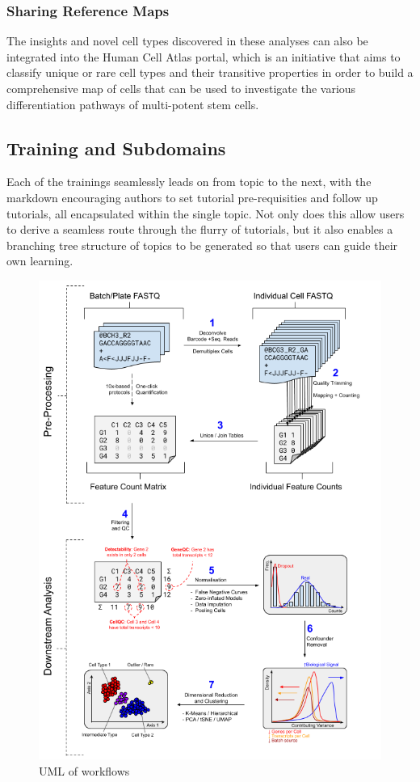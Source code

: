 \documentclass[a4paper,num-refs]{oup-contemporary}
\begin{document}
\subsubsection{Sharing Reference Maps}
The insights and novel cell types discovered in these analyses can also be integrated into the Human Cell Atlas portal, which is an initiative that aims to classify unique or rare cell types and their transitive properties in order to build a comprehensive map of cells that can be used to investigate the various differentiation pathways of multi-potent stem cells.


\subsection{Training and Subdomains}

Each of the trainings seamlessly leads on from topic to the next, with the markdown encouraging authors to set tutorial pre-requisities and follow up tutorials, all encapsulated within the single topic. Not only does this allow users to derive a seamless route through the flurry of tutorials, but it also enables a branching tree structure of topics to be generated so that users can guide their own learning.

\begin{figure}[bt!] %
\centering
\includegraphics[width=\linewidth]{Images/Paper_scRNA_Galaxy_Process.png}
\caption{UML of workflows}\label{fig:example}
\end{figure}
\end{document}
